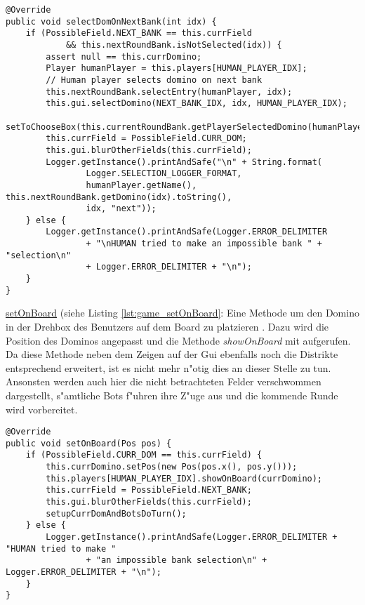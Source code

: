 \begin{lstlisting}[float,style=CodeHighlighting,caption=Game - selectDomOnNextBank,label=game_selectDomOnNextBank]
@Override
public void selectDomOnNextBank(int idx) {
    if (PossibleField.NEXT_BANK == this.currField 
    		&& this.nextRoundBank.isNotSelected(idx)) {
        assert null == this.currDomino;
        Player humanPlayer = this.players[HUMAN_PLAYER_IDX];
        // Human player selects domino on next bank
        this.nextRoundBank.selectEntry(humanPlayer, idx);
        this.gui.selectDomino(NEXT_BANK_IDX, idx, HUMAN_PLAYER_IDX);
        setToChooseBox(this.currentRoundBank.getPlayerSelectedDomino(humanPlayer));
        this.currField = PossibleField.CURR_DOM;
        this.gui.blurOtherFields(this.currField);
        Logger.getInstance().printAndSafe("\n" + String.format(
        		Logger.SELECTION_LOGGER_FORMAT,
                humanPlayer.getName(), this.nextRoundBank.getDomino(idx).toString(),
                idx, "next"));
    } else {
        Logger.getInstance().printAndSafe(Logger.ERROR_DELIMITER
                + "\nHUMAN tried to make an impossible bank " + "selection\n" 
                + Logger.ERROR_DELIMITER + "\n");
    }
}
\end{lstlisting}

\underline{setOnBoard} (siehe Listing \ref{lst:game_setOnBoard}: Eine Methode um den Domino in der Drehbox des Benutzers auf dem Board zu platzieren . Dazu wird die Position des Dominos angepasst und die Methode \emph{showOnBoard} mit aufgerufen. Da diese Methode neben dem Zeigen auf der Gui ebenfalls noch die Distrikte entsprechend erweitert, ist es nicht mehr n"otig dies an dieser Stelle zu tun. Ansonsten werden auch hier die nicht betrachteten Felder verschwommen dargestellt, s"amtliche Bots f"uhren ihre Z"uge aus und die kommende Runde wird vorbereitet. 

\begin{lstlisting}[float,style=CodeHighlighting,caption=Game - setOnBoard,label=lst:game_setOnBoard]
@Override
public void setOnBoard(Pos pos) {
    if (PossibleField.CURR_DOM == this.currField) {
        this.currDomino.setPos(new Pos(pos.x(), pos.y()));
        this.players[HUMAN_PLAYER_IDX].showOnBoard(currDomino);
        this.currField = PossibleField.NEXT_BANK;
        this.gui.blurOtherFields(this.currField);
        setupCurrDomAndBotsDoTurn();
    } else {
        Logger.getInstance().printAndSafe(Logger.ERROR_DELIMITER + "HUMAN tried to make "
        		+ "an impossible bank selection\n" + Logger.ERROR_DELIMITER + "\n");
    }
}
\end{lstlisting}


